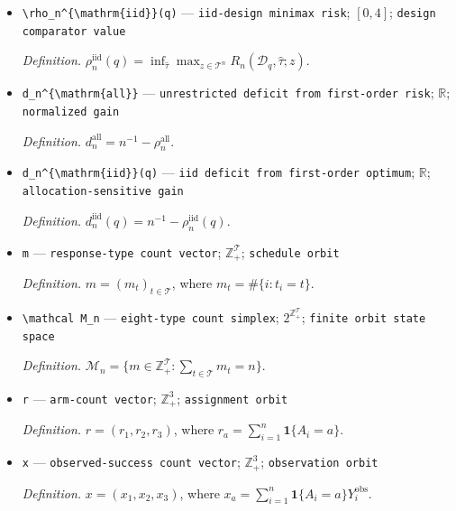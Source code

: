 \documentclass{article}
\begin{document}
\begin{itemize}
  \item \texttt{\textbackslash{}\allowbreak{}rho\_\allowbreak{}n\textasciicircum{}\{\textbackslash{}\allowbreak{}mathrm\{iid\}\allowbreak{}\}\allowbreak{}(q)} --- \texttt{iid-\allowbreak{}design minimax risk}; \([0,4]\); \texttt{design comparator value}
  \par\smallskip\noindent\emph{Definition.} \(\rho_n^{\mathrm{iid}}(q)=\inf_{\widehat\tau}\max_{z\in\mathcal T^n}R_n(\mathcal D_q,\widehat\tau;z)\).
  \item \texttt{d\_\allowbreak{}n\textasciicircum{}\{\textbackslash{}\allowbreak{}mathrm\{all\}\allowbreak{}\}\allowbreak{}} --- \texttt{unrestricted deficit from first-\allowbreak{}order risk}; \(\mathbb R\); \texttt{normalized gain}
  \par\smallskip\noindent\emph{Definition.} \(d_n^{\mathrm{all}}=n^{-1}-\rho_n^{\mathrm{all}}\).
  \item \texttt{d\_\allowbreak{}n\textasciicircum{}\{\textbackslash{}\allowbreak{}mathrm\{iid\}\allowbreak{}\}\allowbreak{}(q)} --- \texttt{iid deficit from first-\allowbreak{}order optimum}; \(\mathbb R\); \texttt{allocation-\allowbreak{}sensitive gain}
  \par\smallskip\noindent\emph{Definition.} \(d_n^{\mathrm{iid}}(q)=n^{-1}-\rho_n^{\mathrm{iid}}(q)\).
  \item \texttt{m} --- \texttt{response-\allowbreak{}type count vector}; \(\mathbb Z_+^{\mathcal T}\); \texttt{schedule orbit}
  \par\smallskip\noindent\emph{Definition.} \(m=(m_t)_{t\in\mathcal T}\), where \(m_t=\#\{i:t_i=t\}\).
  \item \texttt{\textbackslash{}\allowbreak{}mathcal M\_\allowbreak{}n} --- \texttt{eight-\allowbreak{}type count simplex}; \(2^{\mathbb Z_+^{\mathcal T}}\); \texttt{finite orbit state space}
  \par\smallskip\noindent\emph{Definition.} \(\mathcal M_n=\{m\in\mathbb Z_+^{\mathcal T}:\sum_{t\in\mathcal T}m_t=n\}\).
  \item \texttt{r} --- \texttt{arm-\allowbreak{}count vector}; \(\mathbb Z_+^3\); \texttt{assignment orbit}
  \par\smallskip\noindent\emph{Definition.} \(r=(r_1,r_2,r_3)\), where \(r_a=\sum_{i=1}^n\mathbf 1\{A_i=a\}\).
  \item \texttt{x} --- \texttt{observed-\allowbreak{}success count vector}; \(\mathbb Z_+^3\); \texttt{observation orbit}
  \par\smallskip\noindent\emph{Definition.} \(x=(x_1,x_2,x_3)\), where \(x_a=\sum_{i=1}^n\mathbf 1\{A_i=a\}Y_i^{\mathrm{obs}}\).

\end{itemize}
\end{document}
